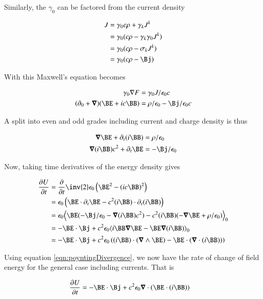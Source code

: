 \documentclass{article}
\begin{document}
Similarly, the $\gamma_0$ can be factored from the current density

\begin{align*}
J 
&= \gamma_0 c \rho + \gamma_k J^k \\
&= \gamma_0 (c \rho - \gamma_k \gamma_0 J^k) \\
&= \gamma_0 (c \rho - \sigma_k J^k) \\
&= \gamma_0 (c \rho - \Bj )
\end{align*}

With this Maxwell's equation becomes
 
\begin{align*}
\gamma_0 \grad F &= \gamma_0 J / \epsilon_0 c \\
(\partial_0 + \spacegrad) ( \BE + i c \BB ) &= \rho/\epsilon_0 - \Bj/\epsilon_0 c \\
\end{align*}
 
A split into even and odd grades including current and charge density is thus
 
\begin{align*}
\spacegrad \BE + \partial_t (i \BB) &= \rho/\epsilon_0 \\
\spacegrad (i \BB) c^2 + \partial_t \BE &= -\Bj/\epsilon_0
\end{align*}
 
Now, taking time derivatives of the energy density gives

\begin{align*}
\PD{t}{U} 
&= \PD{t}{}\inv{2} \epsilon_0 \left( \BE^2 - (ic \BB)^2 \right) \\
&= \epsilon_0 \left( \BE \cdot \partial_t \BE - c^2 (i\BB) \cdot \partial_t (i\BB) \right) \\
&= \epsilon_0 \gpgradezero{ \BE ( -\Bj/\epsilon_0 -\spacegrad (i \BB) c^2 ) - c^2 (i\BB) ( -\spacegrad \BE + \rho/\epsilon_0 ) } \\
&= -\BE \cdot \Bj + c^2 \epsilon_0 \gpgradezero{ i\BB \spacegrad \BE -\BE \spacegrad (i \BB) } \\
&= -\BE \cdot \Bj + c^2 \epsilon_0 \left( (i\BB) \cdot (\spacegrad \wedge \BE) - \BE \cdot (\spacegrad \cdot (i \BB)) \right) \\
\end{align*}

Using equation \ref{eqn:poyntingDivergence}, we now have the rate of change of
field energy for the general case including currents.  That is

\begin{align}
\PD{t}{U} &= -\BE \cdot \Bj + c^2 \epsilon_0 \spacegrad \cdot (\BE \cdot (i\BB)) 
\end{align}
\end{document}
